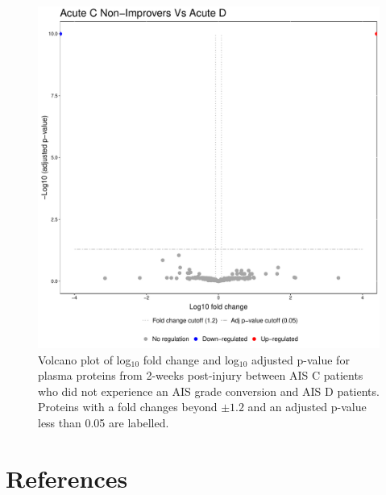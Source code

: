 \documentclass[9pt,lineno]{elife}
\begin{document}
\begin{figure}
\includegraphics[width=1\linewidth]{figures/openms_protein_quantification/label_free/volcano_plots/openms_volcano_plot_2021-08-10_0014} \caption{Volcano plot of log\(_10\) fold change and log\(_10\) adjusted p-value for plasma proteins from 2-weeks post-injury between AIS C patients who did not experience an AIS grade conversion and AIS D patients. Proteins with a fold changes beyond \(\pm 1.2\) and an adjusted p-value less than 0.05 are labelled.}\label{fig:volc-plot-acute-c-nonimp-vs-acute-d}
\end{figure}

\hypertarget{references}{%
\section*{References}\label{references}}
\end{document}
